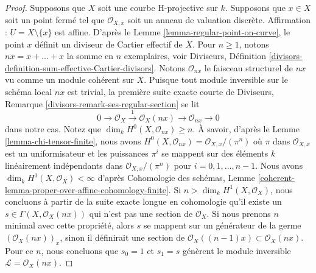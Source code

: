 \begin{proof}
\medskip\noindent
Supposons que $X$ soit une courbe H-projective sur $k$.
Supposons que $x \in X$ soit un point fermé tel que
$\mathcal{O}_{X, x}$ soit un anneau de valuation discrète.
Affirmation : $U = X \setminus \{x\}$ est affine. D'après le
Lemme \ref{lemma-regular-point-on-curve}, le point $x$ définit un
diviseur de Cartier effectif de $X$. Pour $n \geq 1$, notons $nx =
x + \ldots + x$ la somme en $n$ exemplaires, voir Diviseurs,
Définition
\ref{divisors-definition-sum-effective-Cartier-divisors}. Notons
$\mathcal{O}_{nx}$ le faisceau structurel de $nx$ vu comme un module cohérent sur $X$.
Puisque tout module inversible sur le schéma local $nx$ est trivial, la première suite
exacte courte de Diviseurs, Remarque \ref{divisors-remark-ses-regular-section} se lit
$$
0 \to \mathcal{O}_X
\xrightarrow{1} \mathcal{O}_X(nx) \to \mathcal{O}_{nx} \to 0
$$
dans notre cas. Notez que $\dim_k H^0(X, \mathcal{O}_{nx})
\geq n$. À savoir, d'après le Lemme
\ref{lemma-chi-tensor-finite}, nous avons $H^0(X,
\mathcal{O}_{nx}) = \mathcal{O}_{X, x}/(\pi^n)$ où $\pi$ dans
$\mathcal{O}_{X, x}$ est un uniformisateur et les puissances
$\pi^i$ se mappent sur des éléments $k$ linéairement
indépendants dans $\mathcal{O}_{X, x}/(\pi^n)$ pour $i = 0, 1,
\ldots, n - 1$. Nous avons $\dim_k H^1(X, \mathcal{O}_X) <
\infty$ d'après Cohomologie des schémas, Lemme
\ref{coherent-lemma-proper-over-affine-cohomology-finite}. Si $n >
\dim_k H^1(X, \mathcal{O}_X)$, nous concluons à partir de la suite
exacte longue en cohomologie qu'il existe un $s \in \Gamma(X,
\mathcal{O}_X(nx))$ qui n'est pas une section de $\mathcal{O}_X$. Si
nous prenons $n$ minimal avec cette propriété, alors $s$ se mappent
sur un générateur de la germe $\left(\mathcal{O}_X(nx)\right)_x$,
sinon il définirait une section de $\mathcal{O}_X((n - 1)x) \subset
\mathcal{O}_X(nx)$. Pour ce $n$, nous concluons que $s_0 = 1$ et $s_1
= s$ génèrent le module inversible $\mathcal{L} = \mathcal{O}_X(nx)$.


\end{proof}
